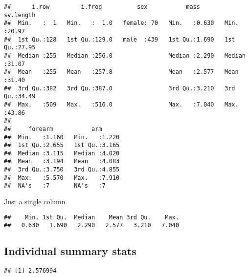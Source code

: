 \documentclass[
]{book}
\newenvironment{Shaded}{\begin{snugshade}}{\end{snugshade}}
\newcommand{\FunctionTok}[1]{\textcolor[rgb]{0.00,0.00,0.00}{#1}}
\newcommand{\NormalTok}[1]{#1}
\newcommand{\SpecialCharTok}[1]{\textcolor[rgb]{0.00,0.00,0.00}{#1}}
\begin{document}
\begin{verbatim}
##      i.row         i.frog          sex           mass         sv.length    
##  Min.   :  1   Min.   :  1.0   female: 70   Min.   :0.630   Min.   :20.97  
##  1st Qu.:128   1st Qu.:129.0   male  :439   1st Qu.:1.690   1st Qu.:27.95  
##  Median :255   Median :256.0                Median :2.290   Median :31.07  
##  Mean   :255   Mean   :257.8                Mean   :2.577   Mean   :31.40  
##  3rd Qu.:382   3rd Qu.:387.0                3rd Qu.:3.210   3rd Qu.:34.49  
##  Max.   :509   Max.   :516.0                Max.   :7.040   Max.   :43.86  
##                                                                            
##     forearm           arm       
##  Min.   :1.160   Min.   :1.220  
##  1st Qu.:2.655   1st Qu.:3.165  
##  Median :3.115   Median :4.020  
##  Mean   :3.194   Mean   :4.083  
##  3rd Qu.:3.750   3rd Qu.:4.855  
##  Max.   :5.570   Max.   :7.910  
##  NA's   :7       NA's   :7
\end{verbatim}

Just a single column

\begin{Shaded}
\end{Shaded}

\begin{verbatim}
##    Min. 1st Qu.  Median    Mean 3rd Qu.    Max. 
##   0.630   1.690   2.290   2.577   3.210   7.040
\end{verbatim}

\hypertarget{individual-summary-stats}{%
\subsection{Individual summary stats}\label{individual-summary-stats}}

\begin{Shaded}
\end{Shaded}

\begin{verbatim}
## [1] 2.576994
\end{verbatim}

\begin{Shaded}
\end{Shaded}
\end{document}
